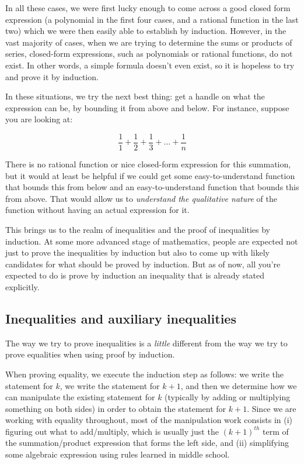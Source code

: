 \documentclass{amsart}
\begin{document}
In all these cases, we were first lucky enough to come across a good
closed form expression (a polynomial in the first four cases, and a
rational function in the last two) which we were then easily able to
establish by induction. However, in the vast majority of cases, when
we are trying to determine the sums or products of series, closed-form
expressions, such as polynomials or rational functions, do not
exist. In other words, a simple formula doesn't even exist, so it is
hopeless to try and prove it by induction.

In these situations, we try the next best thing: get a handle on what
the expression can be, by bounding it from above and below. For
instance, suppose you are looking at:

$$\frac{1}{1} + \frac{1}{2} + \frac{1}{3} + \dots + \frac{1}{n}$$

There is no rational function or nice closed-form expression for this
summation, but it would at least be helpful if we could get some
easy-to-understand function that bounds this from below and an
easy-to-understand function that bounds this from above. That would
allow us to {\em understand the qualitative nature} of the function
without having an actual expression for it.

This brings us to the realm of inequalities and the proof of
inequalities by induction. At some more advanced stage of mathematics,
people are expected not just to prove the inequalities by induction
but also to come up with likely candidates for what should be proved
by induction. But as of now, all you're expected to do is prove by
induction an inequality that is already stated explicitly.

\subsection{Inequalities and auxiliary inequalities}

The way we try to prove inequalities is a {\em little} different from
the way we try to prove equalities when using proof by induction.

When proving equality, we execute the induction step as follows: we
write the statement for $k$, we write the statement for $k + 1$, and
then we determine how we can manipulate the existing statement for $k$
(typically by adding or multiplying something on both sides) in order
to obtain the statement for $k + 1$. Since we are working with
equality throughout, most of the manipulation work consists in (i)
figuring out what to add/multiply, which is usually just the $(k +
1)^{th}$ term of the summation/product expression that forms the left
side, and (ii) simplifying some algebraic expression using rules
learned in middle school.
\end{document}
